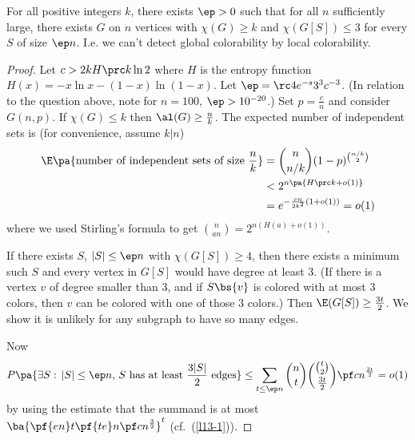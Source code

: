 \begin{thm}
For all positive integers $k$, there exists $\ep>0$ such that for all $n$ sufficiently large, there exists $G$ on $n$ vertices with $\chi(G)\ge k$ and $\chi(G[S])\le 3$ for every $S$ of size $\ep n$. I.e. we can't detect global colorability by local colorability.
\end{thm}
\begin{proof}
Let $c>2kH\prc k \ln 2$ where $H$ is the entropy function $H(x)=-x\ln x-(1-x)\ln (1-x)$. 
Let $\ep=\rc 4e^{-s}3^3c^{-3}$. (In relation to the question above, note for $n=100$, $\ep>10^{-20}$.) Set $p=\frac cn$ and consider $G(n,p)$. If $\chi(G)\le k$ then $\al(G)\ge \frac nk$. The expected number of independent sets is (for convenience, assume $k|n$)
\begin{align*}
\E\pa{\text{number of independent sets of size }\frac nk}
&=\binom{n}{n/k}(1-p)^{\binom{n/k}{2}}\\
&<2^{n\pa{H\prc k+o(1)}}\\
&=e^{-\frac{cn}{2k^2}(1+o(1))}=o(1)
\end{align*}
where we used Stirling's formula to get $\binom n{an} =2^{n(H(a)+o(1))}$.

If there exists $S$, $|S|\le \ep n$ with $\chi(G[S])\ge 4$, then there exists a minimum such $S$ and every vertex in $G[S]$ would have degree at least 3. (If there is a vertex $v$ of degree smaller than 3, and if $S\bs \{v\}$ is colored with at most 3 colors, then $v$ can be colored with one of those 3 colors.) Then $\E(G[S])\ge \frac{3t}{2}$. We show it is unlikely for any subgraph to have so many edges.

Now
\[
P\pa{\exists S:\,|S|\le \ep n, \,S\text{ has at least }\frac{3|S|}{2}\text{ edges}}\le
\sum_{t\le \ep n} \binom nt\binom{\binom t2}{\frac{3t}{2}}\pf cn^{\frac{3t}{2}}=o(1)
\]
by using the estimate that the summand is at most $\ba{\pf{en}t\pf{te}n\pf cn^{\frac 32}}^t$ (cf.~(\ref{l13-1})). %
\end{proof}